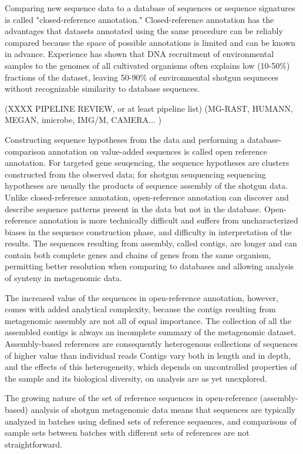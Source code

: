 \documentclass[graybox]{svmult}
\begin{document}
Comparing new sequence data to a database of sequences or sequence signatures is called "closed-reference annotation."  Closed-reference annotation has the advantages that datasets annotated using the same procedure can be reliably compared because the space of possible annotations is limited and can be known in advance.
Experience has shown that DNA recruitment of environmental samples to the genomes of all cultivated organisms often explains low (10-50\%) fractions of the dataset, leaving 50-90\% of environmental shotgun sequneces without recognizable similarity to database sequences.

(XXXX PIPELINE REVIEW, or at least pipeline list)  (MG-RAST, HUMANN, MEGAN, imicrobe, IMG/M, CAMERA... )

Constructing sequence hypotheses from the data and performing a database-comparison annotation on value-added sequences is called open reference annotation.   For targeted gene seuqencing, the sequence hypotheses are clusters constructed from the observed data; for shotgun seuquencing sequencing hypotheses are usually the products of sequence assembly of the shotgun data.   Unlike closed-reference annotation, open-reference annotation can discover and describe sequence patterns present in the data but not in the database.  Open-reference annotation is more technically difficult and suffers from uncharacterized biases in the sequence construction phase, and difficulty in interpretation of the results.  The sequences resulting from assembly, called contigs, are longer and can contain both complete genes and chains of genes from the same organism, permitting better resolution when comparing to databases and allowing analysis of synteny in metagenomic data.

The increased value of the sequences in open-reference annotation, however, comes with added analytical complexity, because the contigs resulting from metagenomic assembly are not all of equal importance.
The collection of all the assembled contigs is always an incomplete summary of the metagenomic dataset.
Assembly-based references are consequently heterogenous collections of sequences of higher value than individual reads
Contigs vary both in length and in depth, and the effects of this heterogeneity, which depends on uncontrolled properties of the sample and its biological diversity, on analysis are as yet unexplored.

The growing nature of the set of reference sequences in open-reference (assembly-based) analysis of shotgun metagenomic data means that sequences are typically analyzed in batches using defined sets of reference sequences, and comparisons of sample sets between batches with different sets of references are not straightforward.
\end{document}
